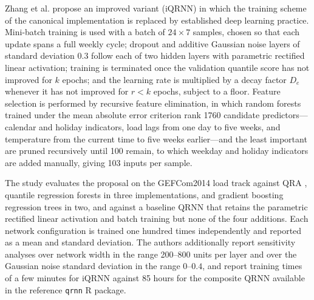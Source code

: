 \documentclass[10pt,journal,compsoc]{IEEEtran}
\begin{document}
Zhang et al. \cite{zhang2019improved} propose an improved variant (iQRNN) in which the
training scheme of the canonical implementation is replaced by established deep learning
practice. Mini-batch training is used with a batch of $24 \times 7$ samples, chosen so that
each update spans a full weekly cycle; dropout and additive Gaussian noise layers of standard
deviation $0.3$ follow each of two hidden layers with parametric rectified linear activation;
training is terminated once the validation quantile score has not improved for $k$ epochs; and
the learning rate is multiplied by a decay factor $D_e$ whenever it has not improved for
$r < k$ epochs, subject to a floor. Feature selection is performed by recursive feature
elimination, in which random forests trained under the mean absolute error criterion rank
1760 candidate predictors---calendar and holiday indicators, load lags from one day to five
weeks, and temperature from the current time to five weeks earlier---and the least important
are pruned recursively until 100 remain, to which weekday and holiday indicators are added
manually, giving 103 inputs per sample.

The study evaluates the proposal on the GEFCom2014 load track \cite{hong2016gefcom} against
QRA \cite{liu2017probabilistic}, quantile regression forests in three implementations, and
gradient boosting regression trees in two, and against a baseline QRNN that retains the
parametric rectified linear activation and batch training but none of the four additions.
Each network configuration is trained one hundred times independently and reported as a mean
and standard deviation. The authors additionally report sensitivity analyses over network
width in the range 200--800 units per layer and over the Gaussian noise standard deviation in
the range $0$--$0.4$, and report training times of a few minutes for iQRNN against 85 hours
for the composite QRNN available in the reference \texttt{qrnn} R package.
\end{document}
